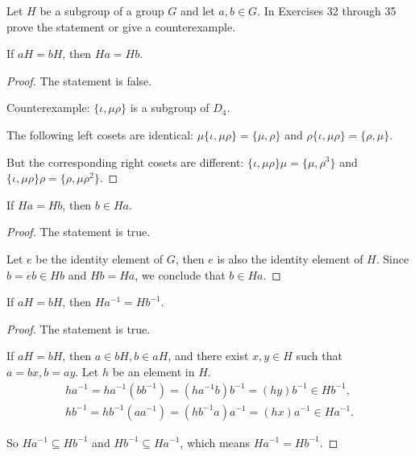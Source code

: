Let $H$ be a subgroup of a group $G$ and let $a, b\in G$. In Exercises 32 through 35 prove the statement or give a counterexample.

\begin{exercise}
    If $aH = bH$, then $Ha = Hb$.
\end{exercise}

\begin{proof}
    The statement is false.

    Counterexample: $\{ \iota, \mu\rho \}$ is a subgroup of $D_{4}$.

    The following left cosets are identical: $\mu\{ \iota, \mu\rho \} = \{ \mu, \rho \}$ and $\rho \{ \iota, \mu\rho \} = \{ \rho, \mu \}$.

    But the corresponding right cosets are different: $\{ \iota, \mu\rho \}\mu = \{ \mu, \rho^{3} \}$ and $\{ \iota, \mu\rho \}\rho = \{ \rho, \mu\rho^{2} \}$.
\end{proof}

\begin{exercise}
    If $Ha = Hb$, then $b\in Ha$.
\end{exercise}

\begin{proof}
    The statement is true.

    Let $e$ be the identity element of $G$, then $e$ is also the identity element of $H$. Since $b = eb\in Hb$ and $Hb = Ha$, we conclude that $b\in Ha$.
\end{proof}

\begin{exercise}
    If $aH = bH$, then $Ha^{-1} = Hb^{-1}$.
\end{exercise}

\begin{proof}
    The statement is true.

    If $aH = bH$, then $a\in bH, b\in aH$, and there exist $x, y\in H$ such that $a = bx, b = ay$. Let $h$ be an element in $H$.
    \[
        \begin{split}
            ha^{-1} = ha^{-1}(bb^{-1}) = (ha^{-1}b)b^{-1} = (hy)b^{-1} \in Hb^{-1}, \\
            hb^{-1} = hb^{-1}(aa^{-1}) = (hb^{-1}a)a^{-1} = (hx)a^{-1} \in Ha^{-1}.
        \end{split}
    \]

    So $Ha^{-1} \subseteq Hb^{-1}$ and $Hb^{-1} \subseteq Ha^{-1}$, which means $Ha^{-1} = Hb^{-1}$.
\end{proof}

